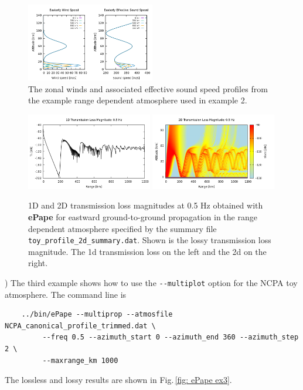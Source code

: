 \begin{figure}[h]
\begin{center}
\includegraphics[width=0.5\textwidth]{figs/ePape_ex2_profiles.png}
\end{center}
\caption{The zonal winds and associated effective sound speed profiles from the example range dependent atmosphere used in example 2.}
\label{fig: ePape ex2 profiles}
\end{figure}


\begin{figure}[h]
\begin{center}
\includegraphics[width=0.49\textwidth]{figs/ePape_ex2_1d}
\includegraphics[width=0.49\textwidth]{figs/ePape_ex2_2d}
\end{center}
\caption{1D and 2D transmission loss magnitudes at 0.5 Hz obtained with {\bf ePape} for eastward ground-to-ground propagation in the range dependent atmosphere specified by the summary file {\tt toy\_profile\_2d\_summary.dat}. Shown is the lossy transmission loss magnitude. The 1d transmission loss on the left and the 2d on the right.}
\label{fig: ePape ex2}
\end{figure}

) The third example shows how to use the \verb+--multiplot+ option for the NCPA toy atmosphere. The command line is
\begin{verbatim}
    ../bin/ePape --multiprop --atmosfile NCPA_canonical_profile_trimmed.dat \
         --freq 0.5 --azimuth_start 0 --azimuth_end 360 --azimuth_step 2 \
         --maxrange_km 1000
\end{verbatim}
The lossless and lossy results are shown in Fig.\,\ref{fig: ePape ex3}. 
         
